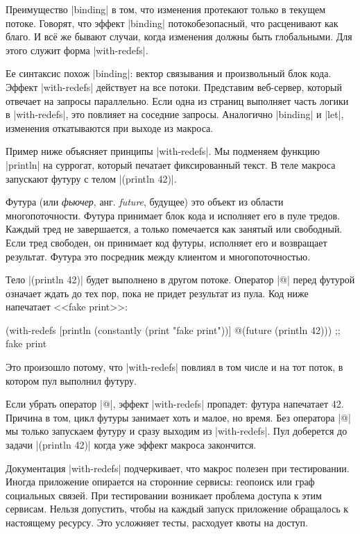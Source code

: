 \label{with-redefs}

Преимущество \spverb|binding| в том, что изменения протекают только в текущем
потоке. Говорят, что эффект \spverb|binding| потокобезопасный, что расценивают
как благо. И вс\"{е} же бывают случаи, когда изменения должны быть глобальными. Для
этого служит форма \spverb|with-redefs|.

Ее синтаксис похож \spverb|binding|: вектор связывания и произвольный блок
кода. Эффект \spverb|with-redefs| действует на все потоки. Представим
веб-сервер, который отвечает на запросы параллельно. Если одна из страниц
выполняет часть логики в \spverb|with-redefs|, это повлияет на соседние
запросы. Аналогично \spverb|binding| и \spverb|let|, изменения откатываются при
выходе из макроса.

Пример ниже объясняет принципы \spverb|with-redefs|. Мы подменяем функцию
\spverb|println| на суррогат, который печатает фиксированный текст. В теле
макроса запускают футуру с телом \spverb|(println 42)|.

Футура (или \emph{фьючер}, анг. \emph{future}, будущее) это объект из области
многопоточности. Футура принимает блок кода и исполняет его в пуле
тредов. Каждый тред не завершается, а только помечается как занятый или
свободный. Если тред свободен, он принимает код футуры, исполняет его и
возвращает результат. Футура это посредник между клиентом и многопоточностью.

Тело \spverb|(println 42)| будет выполнено в другом потоке. Оператор \spverb|@|
перед футурой означает ждать до тех пор, пока не придет результат из пула. Код
ниже напечатает <<fake print>>:

\begin{english}
  \begin{clojure}
(with-redefs
  [println (constantly (print "fake print"))]
  @(future (println 42)))
;; fake print
  \end{clojure}
\end{english}

Это произошло потому, что \spverb|with-redefs| повлиял в том числе и на тот
поток, в котором пул выполнил футуру.

Если убрать оператор \spverb|@|, эффект \spverb|with-redefs| пропадет: футура
напечатает 42. Причина в том, цикл футуры занимает хоть и малое, но время. Без
оператора \spverb|@| мы только запускаем футуру и сразу выходим из
\spverb|with-redefs|. Пул доберется до задачи \spverb|(println 42)| когда уже
эффект макроса закончится.

Документация \spverb|with-redefs| подчеркивает, что макрос полезен при
тестировании. Иногда приложение опирается на сторонние сервисы: геопоиск или
граф социальных связей. При тестировании возникает проблема доступа к этим
сервисам. Нельзя допустить, чтобы на каждый запуск приложение обращалось к
настоящему ресурсу. Это усложняет тесты, расходует квоты на доступ.

